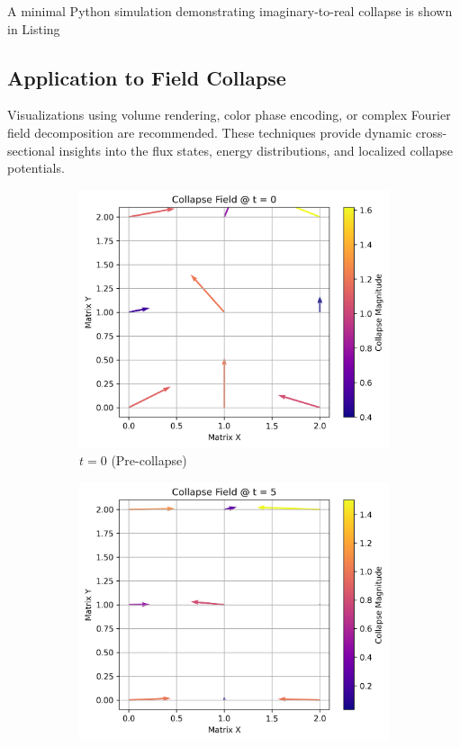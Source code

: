     
\noindent
A minimal Python simulation demonstrating imaginary-to-real collapse is shown in Listing~
\subsection*{Application to Field Collapse}
Visualizations using volume rendering, color phase encoding, or complex Fourier field decomposition are recommended. \cite{imaginary_meta} These techniques provide dynamic cross-sectional insights into the flux states, energy distributions, and localized collapse potentials. \cite{imaginary_meta} 
\begin{figure}[H]
    \centering
    \begin{subfigure}[t]{0.3\textwidth}
      \includegraphics[width=\linewidth]{images/collapse_vector_t0.png}
      \caption{$t=0$ (Pre-collapse)}
    \end{subfigure}
    \hfill
    \begin{subfigure}[t]{0.3\textwidth}
      \includegraphics[width=\linewidth]{images/collapse_vector_t5.png}

\end{subfigure}
\end{figure}
